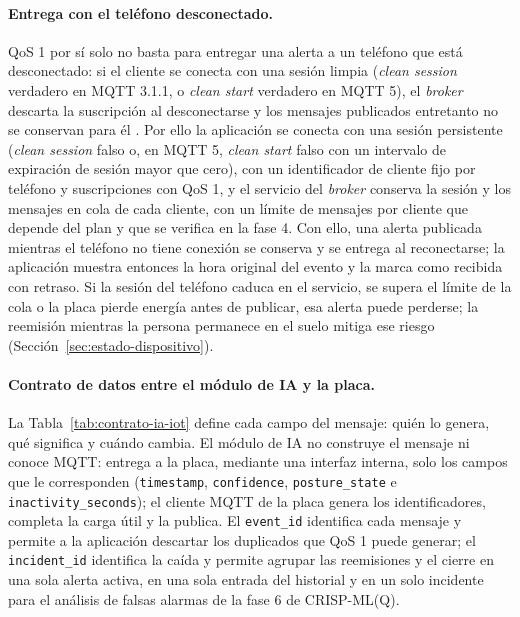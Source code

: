 \documentclass[12pt,a4paper,oneside]{book}
\theoremstyle{plain}
\theoremstyle{definition}
\theoremstyle{remark}
\begin{document}
\paragraph{Entrega con el teléfono desconectado.} QoS 1 por sí solo no basta para entregar una alerta a un teléfono que está desconectado: si el cliente se conecta con una sesión limpia (\textit{clean session} verdadero en MQTT 3.1.1, o \textit{clean start} verdadero en MQTT 5), el \textit{broker} descarta la suscripción al desconectarse y los mensajes publicados entretanto no se conservan para él \parencite{oasis2019mqtt5,oasis2014mqtt311}. Por ello la aplicación se conecta con una sesión persistente (\textit{clean session} falso o, en MQTT 5, \textit{clean start} falso con un intervalo de expiración de sesión mayor que cero), con un identificador de cliente fijo por teléfono y suscripciones con QoS 1, y el servicio del \textit{broker} conserva la sesión y los mensajes en cola de cada cliente, con un límite de mensajes por cliente que depende del plan y que se verifica en la fase 4. Con ello, una alerta publicada mientras el teléfono no tiene conexión se conserva y se entrega al reconectarse; la aplicación muestra entonces la hora original del evento y la marca como recibida con retraso. Si la sesión del teléfono caduca en el servicio, se supera el límite de la cola o la placa pierde energía antes de publicar, esa alerta puede perderse; la reemisión mientras la persona permanece en el suelo mitiga ese riesgo (Sección~\ref{sec:estado-dispositivo}).

\paragraph{Contrato de datos entre el módulo de IA y la placa.} La Tabla~\ref{tab:contrato-ia-iot} define cada campo del mensaje: quién lo genera, qué significa y cuándo cambia. El módulo de IA no construye el mensaje ni conoce MQTT: entrega a la placa, mediante una interfaz interna, solo los campos que le corresponden (\texttt{timestamp}, \texttt{confidence}, \texttt{posture\_state} e \texttt{inactivity\_seconds}); el cliente MQTT de la placa genera los identificadores, completa la carga útil y la publica. El \texttt{event\_id} identifica cada mensaje y permite a la aplicación descartar los duplicados que QoS 1 puede generar; el \texttt{incident\_id} identifica la caída y permite agrupar las reemisiones y el cierre en una sola alerta activa, en una sola entrada del historial y en un solo incidente para el análisis de falsas alarmas de la fase 6 de CRISP-ML(Q).
\end{document}
